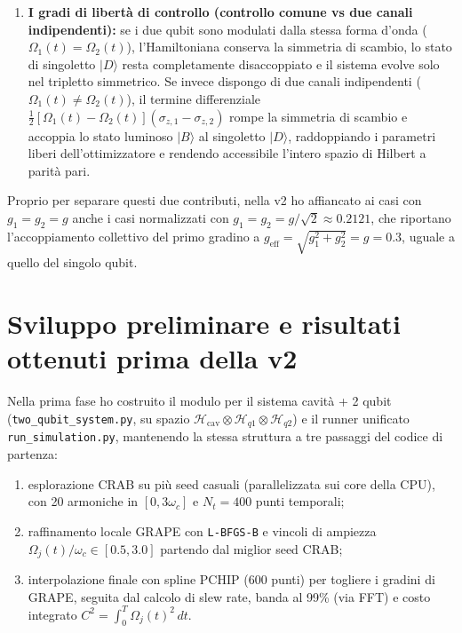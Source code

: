 \documentclass[11pt,a4paper]{article}
\begin{document}
\begin{enumerate}
    \item \textbf{I gradi di libertà di controllo (controllo comune vs due canali indipendenti):} se i due qubit sono modulati dalla stessa forma d'onda ($\Omega_1(t) = \Omega_2(t)$), l'Hamiltoniana conserva la simmetria di scambio, lo stato di singoletto $|D\rangle$ resta completamente disaccoppiato e il sistema evolve solo nel tripletto simmetrico. Se invece dispongo di due canali indipendenti ($\Omega_1(t) \neq \Omega_2(t)$), il termine differenziale $\frac{1}{2}[\Omega_1(t)-\Omega_2(t)](\sigma_{z,1}-\sigma_{z,2})$ rompe la simmetria di scambio e accoppia lo stato luminoso $|B\rangle$ al singoletto $|D\rangle$, raddoppiando i parametri liberi dell'ottimizzatore e rendendo accessibile l'intero spazio di Hilbert a parità pari.
\end{enumerate}

\noindent
Proprio per separare questi due contributi, nella v2 ho affiancato ai casi con $g_1 = g_2 = g$ anche i casi normalizzati con $g_1 = g_2 = g/\sqrt{2} \approx 0.2121$, che riportano l'accoppiamento collettivo del primo gradino a $g_{\text{eff}} = \sqrt{g_1^2+g_2^2} = g = 0.3$, uguale a quello del singolo qubit.

\section{Sviluppo preliminare e risultati ottenuti prima della v2}

Nella prima fase ho costruito il modulo per il sistema cavità + 2 qubit (\texttt{two\_qubit\_system.py}, su spazio $\mathcal{H}_{\text{cav}} \otimes \mathcal{H}_{q1} \otimes \mathcal{H}_{q2}$) e il runner unificato \texttt{run\_simulation.py}, mantenendo la stessa struttura a tre passaggi del codice di partenza:
\begin{enumerate}
    \item esplorazione CRAB su più seed casuali (parallelizzata sui core della CPU), con 20 armoniche in $[0, 3\omega_c]$ e $N_t = 400$ punti temporali;
    \item raffinamento locale GRAPE con \texttt{L-BFGS-B} e vincoli di ampiezza $\Omega_j(t)/\omega_c \in [0.5, 3.0]$ partendo dal miglior seed CRAB;
    \item interpolazione finale con spline PCHIP (600 punti) per togliere i gradini di GRAPE, seguita dal calcolo di slew rate, banda al 99\% (via FFT) e costo integrato $C^2 = \int_0^T \Omega_j(t)^2\,dt$.
\end{enumerate}
\end{document}
